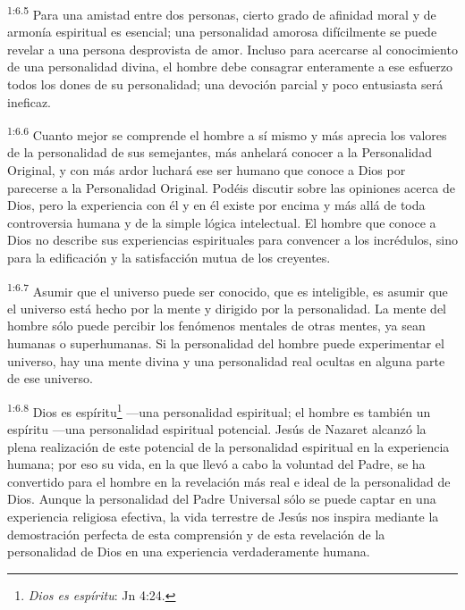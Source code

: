 \par
\textsuperscript{1:6.5} Para una amistad entre dos personas, cierto grado de afinidad moral y de armonía espiritual es esencial; una personalidad amorosa difícilmente se puede revelar a una persona desprovista de amor. Incluso para acercarse al conocimiento de una personalidad divina, el hombre debe consagrar enteramente a ese esfuerzo todos los dones de su personalidad; una devoción parcial y poco entusiasta será ineficaz.

\par
\textsuperscript{1:6.6} Cuanto mejor se comprende el hombre a sí mismo y más aprecia los valores de la personalidad de sus semejantes, más anhelará conocer a la Personalidad Original, y con más ardor luchará ese ser humano que conoce a Dios por parecerse a la Personalidad Original. Podéis discutir sobre las opiniones acerca de Dios, pero la experiencia con él y en él existe por encima y más allá de toda controversia humana y de la simple lógica intelectual. El hombre que conoce a Dios no describe sus experiencias espirituales para convencer a los incrédulos, sino para la edificación y la satisfacción mutua de los creyentes.

\par
\textsuperscript{1:6.7} Asumir que el universo puede ser conocido, que es inteligible, es asumir que el universo está hecho por la mente y dirigido por la personalidad. La mente del hombre sólo puede percibir los fenómenos mentales de otras mentes, ya sean humanas o superhumanas. Si la personalidad del hombre puede experimentar el universo, hay una mente divina y una personalidad real ocultas en alguna parte de ese universo.

\par
\textsuperscript{1:6.8} Dios es espíritu\footnote{\textit{Dios es espíritu}: Jn 4:24.} ---una personalidad espiritual; el hombre es también un espíritu ---una personalidad espiritual potencial. Jesús de Nazaret alcanzó la plena realización de este potencial de la personalidad espiritual en la experiencia humana; por eso su vida, en la que llevó a cabo la voluntad del Padre, se ha convertido para el hombre en la revelación más real e ideal de la personalidad de Dios. Aunque la personalidad del Padre Universal sólo se puede captar en una experiencia religiosa efectiva, la vida terrestre de Jesús nos inspira mediante la demostración perfecta de esta comprensión y de esta revelación de la personalidad de Dios en una experiencia verdaderamente humana.

